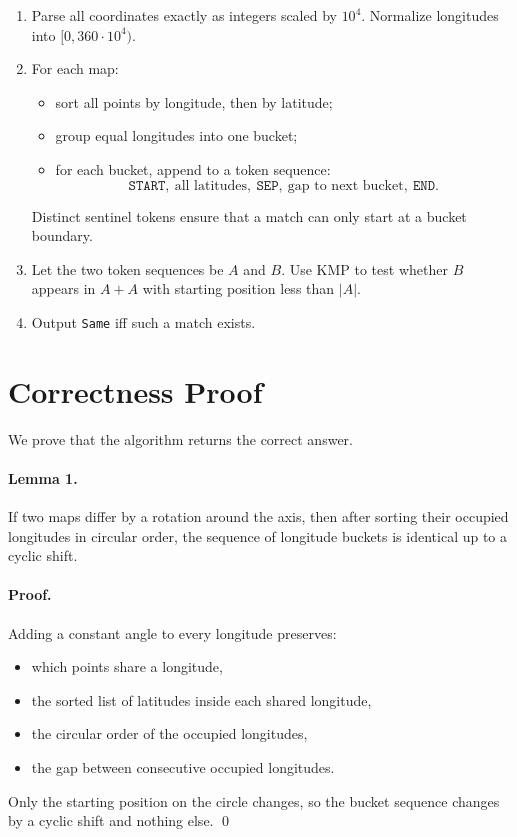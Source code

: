 \documentclass[11pt]{article}
\begin{document}
\begin{enumerate}[leftmargin=*]
    \item Parse all coordinates exactly as integers scaled by $10^4$.
    Normalize longitudes into $[0,360 \cdot 10^4)$.
    \item For each map:
    \begin{itemize}[leftmargin=*]
        \item sort all points by longitude, then by latitude;
        \item group equal longitudes into one bucket;
        \item for each bucket, append to a token sequence:
        \[
            \texttt{START},\ \text{all latitudes},\ \texttt{SEP},\ \text{gap to next bucket},\ \texttt{END}.
        \]
    \end{itemize}
    Distinct sentinel tokens ensure that a match can only start at a bucket boundary.
    \item Let the two token sequences be $A$ and $B$.
    Use KMP to test whether $B$ appears in $A+A$ with starting position less than $|A|$.
    \item Output \texttt{Same} iff such a match exists.
\end{enumerate}

\section*{Correctness Proof}

We prove that the algorithm returns the correct answer.

\paragraph{Lemma 1.}
If two maps differ by a rotation around the axis, then after sorting their occupied longitudes in circular
order, the sequence of longitude buckets is identical up to a cyclic shift.

\paragraph{Proof.}
Adding a constant angle to every longitude preserves:
\begin{itemize}[leftmargin=*]
    \item which points share a longitude,
    \item the sorted list of latitudes inside each shared longitude,
    \item the circular order of the occupied longitudes,
    \item the gap between consecutive occupied longitudes.
\end{itemize}
Only the starting position on the circle changes, so the bucket sequence changes by a cyclic shift and
nothing else. \qed
\end{document}
